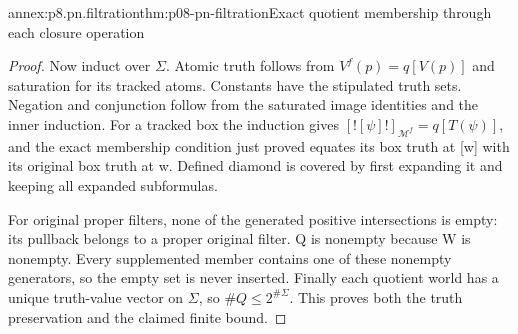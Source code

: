 \begin{annexitem}{annex:p8.pn.filtration}{thm:p08-pn-filtration}{Exact quotient membership through each closure operation}
\begin{proof}
Now induct over \(\Sigma\). Atomic truth follows from
\(V^f(p)=q[V(p)]\) and saturation for its tracked atoms.
Constants have the stipulated truth sets. Negation and conjunction
follow from the saturated image identities and the inner induction.
For a tracked box the induction gives
\([![\psi]!]_{\mathcal M^f}=q[T(\psi)]\), and the exact
membership condition just proved equates its box truth at [w]
with its original box truth at w. Defined diamond is covered by
first expanding it and keeping all expanded subformulas.

For original proper filters, none of the generated positive
intersections is empty: its pullback belongs to a proper original
filter. Q is nonempty because W is nonempty. Every supplemented
member contains one of these nonempty generators, so the empty
set is never inserted. Finally each quotient world has a unique
truth-value vector on \(\Sigma\), so \(\#Q\leq2^{\#\Sigma}\).
This proves both the truth preservation and the claimed finite bound.
\end{proof}
\end{annexitem}

